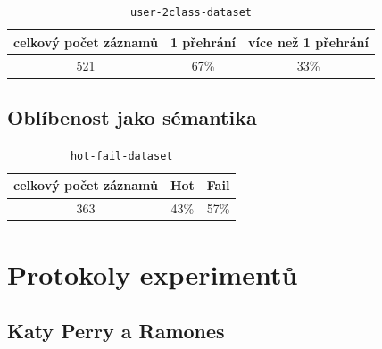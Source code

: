 \documentclass[thesis=M,czech]{FITthesis}[2012/06/26]
\begin{document}
\begin{table}[!htbp]
    \captionsetup{
      justification=raggedright,
      singlelinecheck=false
    }

    \caption{\texttt{user-2class-dataset}}
    \label{sec:user-2class-dataset}
    \begin{tabular}{|c|c|l|}
    \hline
    celkový počet záznamů      & 1 přehrání                  & více než 1 přehrání                   \\ \hline
    {\color[HTML]{000000} 521} & {\color[HTML]{000000} 67\%} & \multicolumn{1}{c|}{33\%} \\ \hline
    \end{tabular}
\end{table}

\section{Oblíbenost jako sémantika}

\begin{table}[!htbp]
    \captionsetup{
      justification=raggedright,
      singlelinecheck=false
    }

    \caption{\texttt{hot-fail-dataset}}
    \label{sec:hot-fail-dataset}
    \begin{tabular}{|c|c|l|}
    \hline
    celkový počet záznamů      &  Hot                  & Fail                   \\ \hline
    {\color[HTML]{000000} 363} & {\color[HTML]{000000} 43\%} & \multicolumn{1}{c|}{57\%} \\ \hline
    \end{tabular}
\end{table}


\chapter{Protokoly experimentů}\label{app:protocols}


\section{Katy Perry a Ramones}\label{exp:kat-ram}
\end{document}
